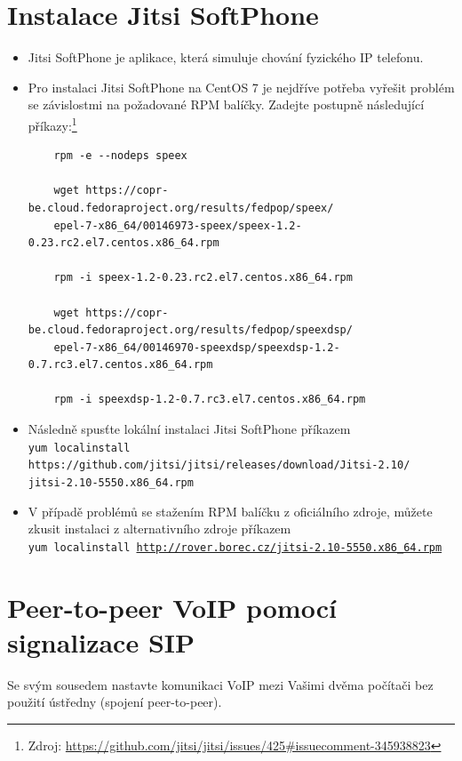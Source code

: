\section{Instalace Jitsi SoftPhone}
\begin{itemize}
  \item Jitsi SoftPhone je aplikace, která simuluje chování fyzického IP telefonu.
  \item Pro instalaci Jitsi SoftPhone na CentOS 7 je nejdříve potřeba vyřešit problém se závislostmi na požadované RPM balíčky. Zadejte postupně následující příkazy:\footnote{Zdroj: \url{https://github.com/jitsi/jitsi/issues/425#issuecomment-345938823}}
      
	\begin{verbatim}
	rpm -e --nodeps speex
	
	wget https://copr-be.cloud.fedoraproject.org/results/fedpop/speex/
	epel-7-x86_64/00146973-speex/speex-1.2-0.23.rc2.el7.centos.x86_64.rpm
	
	rpm -i speex-1.2-0.23.rc2.el7.centos.x86_64.rpm
	
	wget https://copr-be.cloud.fedoraproject.org/results/fedpop/speexdsp/
	epel-7-x86_64/00146970-speexdsp/speexdsp-1.2-0.7.rc3.el7.centos.x86_64.rpm
	
	rpm -i speexdsp-1.2-0.7.rc3.el7.centos.x86_64.rpm
	\end{verbatim}
  \item Následně spusťte lokální instalaci Jitsi SoftPhone příkazem\\
  \texttt{yum localinstall https://github.com/jitsi/jitsi/releases/download/Jitsi-2.10/\\jitsi-2.10-5550.x86\_64.rpm}
  \item V případě problémů se stažením RPM balíčku z oficiálního zdroje, můžete zkusit instalaci z alternativního zdroje příkazem\\
  \texttt{yum localinstall \url{http://rover.borec.cz/jitsi-2.10-5550.x86_64.rpm}}
\end{itemize}

\section{Peer-to-peer VoIP pomocí signalizace SIP}
Se svým sousedem nastavte komunikaci VoIP mezi Vašimi dvěma počítači bez použití ústředny (spojení peer-to-peer).

